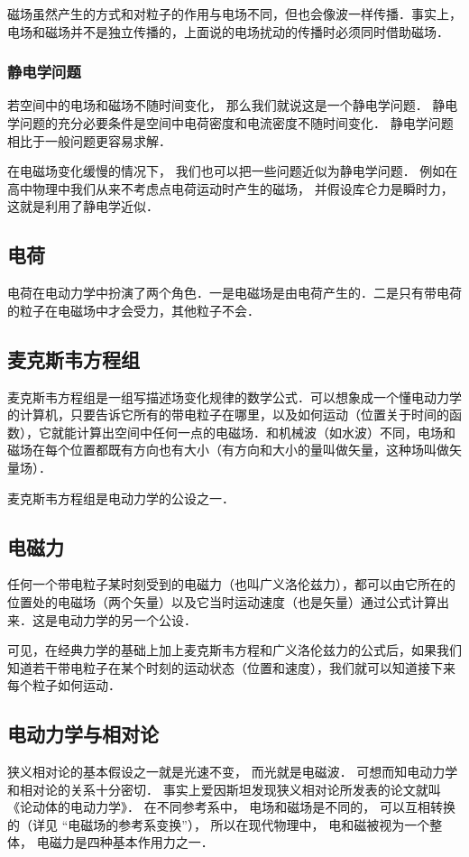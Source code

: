 磁场虽然产生的方式和对粒子的作用与电场不同，但也会像波一样传播．事实上，电场和磁场并不是独立传播的，上面说的电场扰动的传播时必须同时借助磁场．

\subsubsection{静电学问题}
若空间中的电场和磁场不随时间变化， 那么我们就说这是一个静电学问题． 静电学问题的充分必要条件是空间中电荷密度和电流密度不随时间变化． 静电学问题相比于一般问题更容易求解．

在电磁场变化缓慢的情况下， 我们也可以把一些问题近似为静电学问题． 例如在高中物理中我们从来不考虑点电荷运动时产生的磁场， 并假设库仑力是瞬时力， 这就是利用了静电学近似．

\subsection{电荷}
电荷在电动力学中扮演了两个角色．一是电磁场是由电荷产生的．二是只有带电荷的粒子在电磁场中才会受力，其他粒子不会．

\subsection{麦克斯韦方程组}
麦克斯韦方程组是一组写描述场变化规律的数学公式．可以想象成一个懂电动力学的计算机，只要告诉它所有的带电粒子在哪里，以及如何运动（位置关于时间的函数），它就能计算出空间中任何一点的电磁场．和机械波（如水波）不同，电场和磁场在每个位置都既有方向也有大小（有方向和大小的量叫做矢量，这种场叫做矢量场）．

麦克斯韦方程组是电动力学的公设之一．

\subsection{电磁力}
任何一个带电粒子某时刻受到的电磁力（也叫广义洛伦兹力），都可以由它所在的位置处的电磁场（两个矢量）以及它当时运动速度（也是矢量）通过公式计算出来．这是电动力学的另一个公设．

可见，在经典力学的基础上加上麦克斯韦方程和广义洛伦兹力的公式后，如果我们知道若干带电粒子在某个时刻的运动状态（位置和速度），我们就可以知道接下来每个粒子如何运动．

\subsection{电动力学与相对论}
狭义相对论的基本假设之一就是光速不变， 而光就是电磁波． 可想而知电动力学和相对论的关系十分密切． 事实上爱因斯坦发现狭义相对论所发表的论文就叫《论动体的电动力学》． 在不同参考系中， 电场和磁场是不同的， 可以互相转换的（详见 “电磁场的参考系变换”）， 所以在现代物理中， 电和磁被视为一个整体， 电磁力是四种基本作用力之一．
